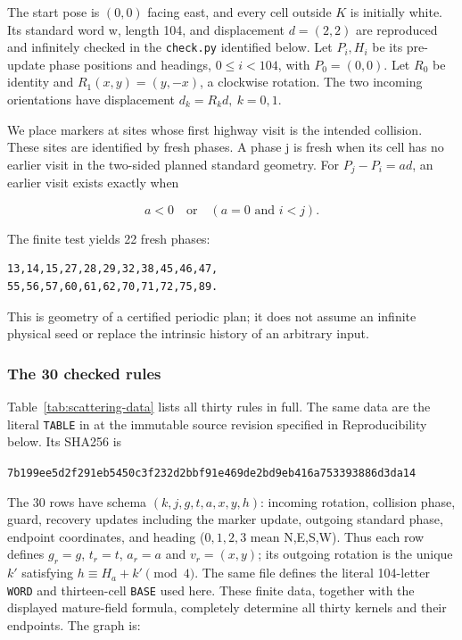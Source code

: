 The start pose is $(0,0)$ facing east, and every cell outside $K$ is
initially white. Its standard word w, length 104, and
displacement $d=(2,2)$ are reproduced and infinitely checked in the \texttt{check.py} identified below.
Let $P_i,H_i$ be its pre-update phase positions and headings,
$0\le i<104$, with $P_0=(0,0)$. Let $R_0$ be identity and
$R_1(x,y)=(y,-x)$, a clockwise rotation. The two incoming
orientations have displacement $d_k=R_kd,\ k=0,1$.

We place markers at sites whose first highway visit is the intended
collision. These sites are identified by fresh phases. A phase j is fresh when its cell has no earlier visit in the two-sided
planned standard geometry. For $P_j-P_i=ad$, an earlier visit exists
exactly when

\[
a<0\quad\text{or}\quad(a=0\text{ and }i<j).
\]

The finite test yields 22 fresh phases:

\begin{lstlisting}
13,14,15,27,28,29,32,38,45,46,47,
55,56,57,60,61,62,70,71,72,75,89.
\end{lstlisting}

This is geometry of a certified periodic plan; it does not assume an
infinite physical seed or replace the intrinsic history of an arbitrary
input.

\subsubsection{The 30 checked rules}\label{the-30-checked-rules}

Table~\ref{tab:scattering-data} lists all thirty rules in full. The same
data are the literal \texttt{TABLE} in
 at the
immutable source revision specified in Reproducibility below. Its SHA256 is
\begin{center}\scriptsize\texttt{7b199ee5d2f291eb5450c3f232d2bbf91e469de2bd9eb416a753393886d3da14}\end{center}
The 30 rows have schema $(k,j,g,t,a,x,y,h)$: incoming rotation, collision
phase, guard, recovery updates including the marker update, outgoing
standard phase, endpoint coordinates, and heading ($0,1,2,3$ mean
N,E,S,W). Thus each row defines $g_r=g$, $t_r=t$, $a_r=a$ and
$v_r=(x,y)$; its outgoing rotation is the unique $k'$ satisfying
$h\equiv H_a+k'\pmod4$. The same file defines the literal 104-letter
\texttt{WORD} and thirteen-cell \texttt{BASE} used here. These finite data,
together with the displayed mature-field formula, completely determine
all thirty kernels and their endpoints. The graph is:

